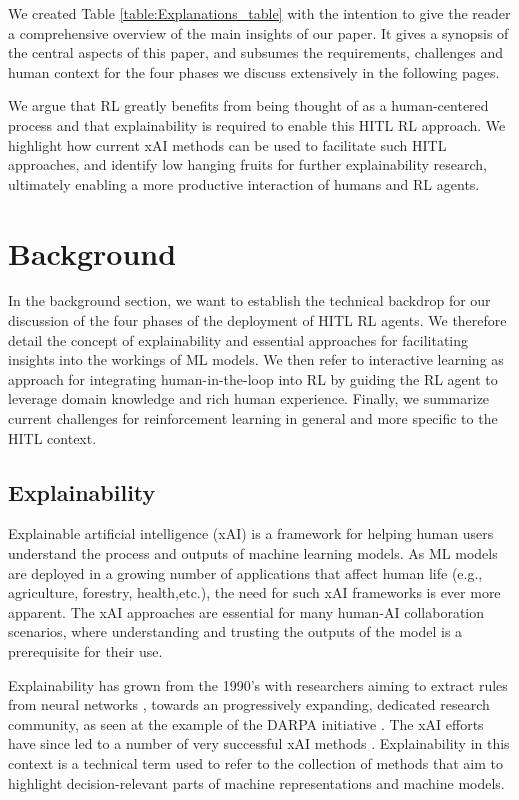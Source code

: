 \documentclass[twoside,11pt]{article}
\begin{document}
\begin{enumerate}
We created  Table \ref{table:Explanations_table} with the intention to give the reader a comprehensive overview of the main insights of our paper. It gives a synopsis of the central aspects of this paper, and subsumes the requirements, challenges and human context for the four phases we discuss extensively in the following pages. 

We argue that RL greatly benefits from being thought of as a human-centered process and that explainability is required to enable this HITL RL approach. We highlight how current xAI methods can be used to facilitate such HITL approaches, and identify 
low hanging fruits for further explainability research, ultimately enabling a more productive interaction of humans and RL agents.

\section{Background}
\label{sec:background}

In the background section, we want to establish the technical backdrop for our discussion of the four phases of the deployment of HITL RL agents. We therefore detail the concept of explainability and essential approaches for facilitating insights into the workings of ML models. We then refer to interactive learning as  approach for integrating human-in-the-loop into RL by guiding the RL agent to leverage domain knowledge and rich human experience. Finally, we summarize current challenges for reinforcement learning in general and more specific to the HITL context.

\subsection{Explainability}

Explainable artificial intelligence (xAI) is a framework for helping human users understand the process and outputs of machine learning models. As ML models are deployed in a growing number of applications that affect human life (e.g., agriculture, forestry, health,etc.), the need for such xAI frameworks is ever more apparent. The xAI approaches are essential for many human-AI collaboration scenarios, where understanding and trusting the outputs of the model is a prerequisite for their use.  

Explainability has grown from the 1990's with researchers aiming to extract rules from neural networks \citep{TickleEtAl:1998:HistoryNN}, towards an progressively expanding, dedicated research community, as seen at the example of the DARPA initiative \citep{GunningAha:2019:DARPA}. The xAI efforts have since led to a number of very successful xAI methods \citep{HolzWoj:2022:XAIOverview, ZhouEtAl:2021:QualitySurvey}. Explainability in this context is a technical term used to refer to the collection of methods that aim to highlight decision-relevant parts of machine representations and machine models.


\end{enumerate}
\end{document}
